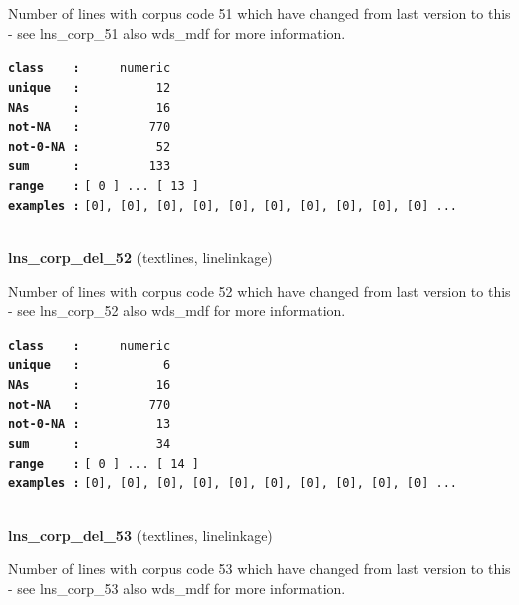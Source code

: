 \documentclass[]{article}
\begin{document}
Number of lines with corpus code 51 which have changed from last version
to this - see lns\_corp\_51 also wds\_mdf for more information.

\textbf{\texttt{class\ \ \ \ :}} \texttt{~~~~~numeric}\\
\textbf{\texttt{unique\ \ \ :}} \texttt{~~~~~~~~~~12}\\
\textbf{\texttt{NAs\ \ \ \ \ \ :}} \texttt{~~~~~~~~~~16}\\
\textbf{\texttt{not-NA\ \ \ :}} \texttt{~~~~~~~~~770}\\
\textbf{\texttt{not-0-NA\ :}} \texttt{~~~~~~~~~~52}\\
\textbf{\texttt{sum\ \ \ \ \ \ :}} \texttt{~~~~~~~~~133}\\
\textbf{\texttt{range\ \ \ \ :}}
\texttt{{[}\ 0\ {]}\ ...\ {[}\ 13\ {]}}\\
\textbf{\texttt{examples\ :}}
\texttt{{[}0{]},\ {[}0{]},\ {[}0{]},\ {[}0{]},\ {[}0{]},\ {[}0{]},\ {[}0{]},\ {[}0{]},\ {[}0{]},\ {[}0{]}\ ...}\\

~

\textbf{lns\_corp\_del\_52} (textlines, linelinkage)

Number of lines with corpus code 52 which have changed from last version
to this - see lns\_corp\_52 also wds\_mdf for more information.

\textbf{\texttt{class\ \ \ \ :}} \texttt{~~~~~numeric}\\
\textbf{\texttt{unique\ \ \ :}} \texttt{~~~~~~~~~~~6}\\
\textbf{\texttt{NAs\ \ \ \ \ \ :}} \texttt{~~~~~~~~~~16}\\
\textbf{\texttt{not-NA\ \ \ :}} \texttt{~~~~~~~~~770}\\
\textbf{\texttt{not-0-NA\ :}} \texttt{~~~~~~~~~~13}\\
\textbf{\texttt{sum\ \ \ \ \ \ :}} \texttt{~~~~~~~~~~34}\\
\textbf{\texttt{range\ \ \ \ :}}
\texttt{{[}\ 0\ {]}\ ...\ {[}\ 14\ {]}}\\
\textbf{\texttt{examples\ :}}
\texttt{{[}0{]},\ {[}0{]},\ {[}0{]},\ {[}0{]},\ {[}0{]},\ {[}0{]},\ {[}0{]},\ {[}0{]},\ {[}0{]},\ {[}0{]}\ ...}\\

~

\textbf{lns\_corp\_del\_53} (textlines, linelinkage)

Number of lines with corpus code 53 which have changed from last version
to this - see lns\_corp\_53 also wds\_mdf for more information.
\end{document}
